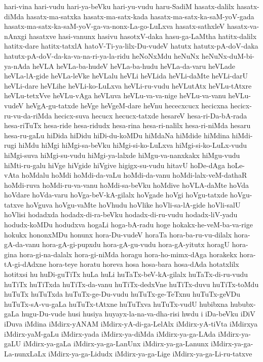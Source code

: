 {hari-vina
hari-vudu
hari-ya-beVku
hari-yu-vudu
haru-SadiM
hasatx-dalilx
hasatx-diMda
hasatx-ma-satxka
hasatx-ma-satx-kada
hasatx-ma-satx-ka-saM-yoV-gada
hasatx-ma-satx-ka-saM-yoV-ga-va-nonx-La-go-LuLxva
hasatx-sathxleV
hasatx-va-nAnxgi
hasatxve
hasi-vanunx
hasivu
hasotxV-daka
hasu-ga-LaMtha
hatitx-dalilx
hatitx-dare
hatitx-tatxlA
hatoV-Ti-ya-lilx-Du-vudeV
hatutx
hatutx-pA-doV-daka
hatutx-pA-doV-da-ka-va-na-ri-ya-la-ridu
heNoNxMdu
heNuNx
heNuNx-duM-bi-ya-nAda
heVLA
heVLa-ba-hudeV
heVLa-ba-hudu
heVLa-da-varu
heVLade
heVLa-lA-gide
heVLa-leVke
heVLalu
heVLi
heVLida
heVLi-daMte
heVLi-darU
heVLi-dare
heVLihe
heVLi-ko-LuLxva
heVLi-ru-vudu
heVLutAtx
heVLu-tAtxre
heVLu-tetxVve
heVLu-vAga
heVLuva
heVLu-va-va-nige
heVLu-va-vanu
heVLu-vudeV
heVgA-gu-tatxde
heVge
heVgeM-dare
heVnu
hececxcucx
hecicxna
hecicx-ru-vu-da-riMda
hecicx-suva
hecucx
hecucx-tatxde
hesareV
hesa-ri-Da-bA-rada
hesa-riTuTx
hesa-ride
hesa-ridudx
hesa-rina
hesa-ri-nalilx
hesa-ri-niMda
hesaru
hesa-ru-gaLu
hiDida
hiDidu
hiDi-du-koMDu
hiMdaNa
hiMdide
hiMdina
hiMdi-rugi
hiMdu
hiMgi
hiMgi-sa-beVku
hiMgi-si-ko-LuLxva
hiMgi-si-ko-LuLx-vudu
hiMgi-suva
hiMgi-su-vudu
hiMgi-ya-lalxde
hiMgu-va-nanxkakx
hiMgu-vudu
hiMti-ru-galu
hiVge
hiVgide
hiVgive
higigx-su-vudu
hitavU
hoDe-dAga
hoLe-vAta
hoMdalu
hoMdi
hoMdi-da-vaLu
hoMdi-da-vanu
hoMdi-lalx-veM-dathaR
hoMdi-ruva
hoMdi-ru-va-vanu
hoMdi-sa-beVku
hoMdive
hoVLA-daMte
hoVda
hoVdare
hoVda-varu
hoVga-beV-kA-gilalx
hoVgade
hoVgi
hoVgu-tatxde
hoVgu-tatxve
hoVguva
hoVgu-vaMte
hoVhudu
hoVlike
hoVli-sa-lA-gide
hoVli-salU
hoVlisi
hodadxda
hodadx-di-ra-beVku
hodadx-di-ru-vudu
hodadx-liV-yadu
hodudx-koMDu
hodudxva
hogaLi
hoga-bA-radu
hoge
hokakx-he-veM-ba-va-rige
hokukx
hononxMDu
honunx
hora-Du-vudeV
horaTa
hora-ba-ru-vu-dilalx
hora-gA-da-vanu
hora-gA-gi-pupxdu
hora-gA-gu-vudu
hora-gA-yitutx
horagU
hora-gina
hora-gi-na-dalalx
hora-gi-niMda
horagu
hora-ho-mimx-dAga
horakekx
hora-tA-gi-dAdxne
hora-teye
horatu
horeva
hosa
hosa-bara
hosa-dAda
hotatxlilx
hotitxsi
hu
huDi-guTiTx
huLa
huLi
huTaTx-beV-kA-gilalx
huTaTx-di-ru-vudu
huTiTx
huTiTxda
huTiTx-da-vanu
huTiTx-dedxVne
huTiTx-duvu
huTiTx-toMdu
huTuTx
huTuTxda
huTuTx-ge-Du-vudu
huTuTx-ge-TeTxnu
huTuTx-geVDu
huTuTx-sA-vu-gaLa
huTuTx-tAtxne
huTuTxva
huTuTx-vudU
hubibxna
hububx-gaLa
hugu-Du-vude
husi
husiya
huyayx-la-na-va-dha-risi
hwdu
i
iDa-beVku
iDiV
iDuva
iMdina
iMdirx-yANAM
iMdirx-yA-di-ga-LelAlx
iMdirx-yA-tiVta
iMdirxya
iMdirx-yaM-gaLu
iMdirx-yada
iMdirx-ya-diMda
iMdirx-ya-ga-LAda
iMdirx-ya-gaLU
iMdirx-ya-gaLa
iMdirx-ya-ga-LanUnx
iMdirx-ya-ga-Lanunx
iMdirx-ya-ga-La-nunxLaLx
iMdirx-ya-ga-Lidudx
iMdirx-ya-ga-Lige
iMdirx-ya-ga-Li-ru-tatxve
}
